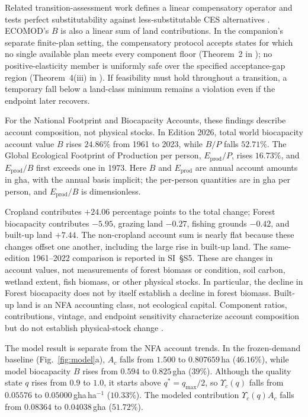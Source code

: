 \documentclass[preprint,12pt,authoryear]{elsarticle}
\newcommand{\Ups}{\Upsilon_c}
\begin{document}
Related transition-assessment work defines a linear compensatory operator and tests perfect substitutability against less-substitutable CES alternatives \citep[Sections~2 and 4 of][]{Abaee2026b}. ECOMOD's $B$ is also a linear sum of land contributions. In the companion's separate finite-plan setting, the compensatory protocol accepts states for which no single available plan meets every component floor (Theorem~2 in \citet{Abaee2026b}); no positive-elasticity member is uniformly safe over the specified acceptance-gap region (Theorem~4(iii) in \citet{Abaee2026b}). If feasibility must hold throughout a transition, a temporary fall below a land-class minimum remains a violation even if the endpoint later recovers.

For the National Footprint and Biocapacity Accounts, these findings describe account composition, not physical stocks. In Edition 2026, total world biocapacity account value $B$ rises $24.86\%$ from 1961 to 2023, while $B/P$ falls $52.71\%$. The Global Ecological Footprint of Production per person, $E_{\mathrm{prod}}/P$, rises $16.73\%$, and $E_{\mathrm{prod}}/B$ first exceeds one in 1973. Here $B$ and $E_{\mathrm{prod}}$ are annual account amounts in gha, with the annual basis implicit; the per-person quantities are in gha per person, and $E_{\mathrm{prod}}/B$ is dimensionless.

Cropland contributes $+24.06$ percentage points to the total change; Forest biocapacity contributes $-5.95$, grazing land $-0.27$, fishing grounds $-0.42$, and built-up land $+7.44$. The non-cropland account sum is nearly flat because these changes offset one another, including the large rise in built-up land. The same-edition 1961--2022 comparison is reported in SI~\S S5. These are changes in account values, not measurements of forest biomass or condition, soil carbon, wetland extent, fish biomass, or other physical stocks. In particular, the decline in Forest biocapacity does not by itself establish a decline in forest biomass. Built-up land is an NFA accounting class, not ecological capital. Component ratios, contributions, vintage, and endpoint sensitivity characterize account composition but do not establish physical-stock change \citep{Lo2026NFA,Borucke2013,Blomqvist2013,GiampietroSaltelli2014,Galli2016,vdBerghGrazi2015}.

The model result is separate from the NFA account trends. In the frozen-demand baseline (Fig.~\ref{fig:model}a), $A_c$ falls from $1.500$ to $0.807659$\,ha ($46.16\%$), while model biocapacity $B$ rises from $0.594$ to $0.825$\,gha ($39\%$). Although the quality state $q$ rises from $0.9$ to $1.0$, it starts above $q^*=q_{\max}/2$, so $\Ups(q)$ falls from $0.05576$ to $0.05000$\,gha\,ha$^{-1}$ ($10.33\%$). The modeled contribution $\Ups(q)A_c$ falls from $0.08364$ to $0.04038$\,gha ($51.72\%$).
\end{document}
